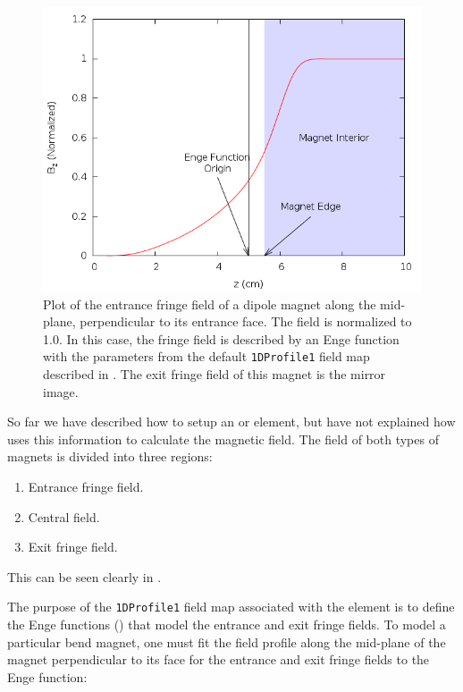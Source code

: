 \begin{figure}[tbh]
\begin{center}
\includegraphics[width=\textwidth]{figures/Elements/Enge-func-plot.png}
\end{center}
\caption{Plot of the entrance fringe field of a dipole magnet along the mid-plane, perpendicular to its entrance face. The field is normalized to 1.0. In this case, the fringe field is described by an Enge function  with the parameters from the default \texttt{1DProfile1} field map described in . The exit fringe field of this magnet is the mirror image.}
\label{fig:rbend_enge_fringe}
\end{figure}

So far we have described how to setup an  or  element, but have not explained how \opalt uses this information to calculate the magnetic field. The field of both types of magnets is divided into three regions:
\begin{enumerate}
\item Entrance fringe field.
\item Central field.
\item Exit fringe field.
\end{enumerate}
This can be seen clearly in .

The purpose of the \texttt{1DProfile1} field map  associated with the element is to define the Enge functions () that model the entrance and exit fringe fields. To model a particular bend magnet, one must fit the field profile along the mid-plane of the magnet perpendicular to its face for the entrance and exit fringe fields to the Enge function:

